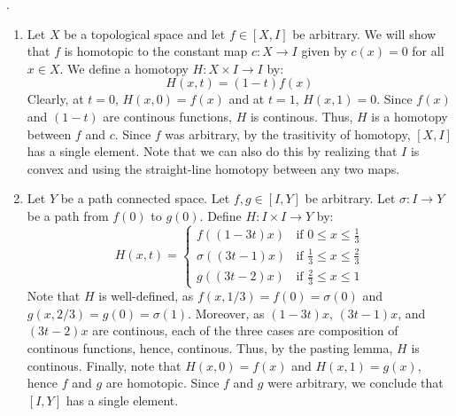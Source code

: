 \documentclass[12pt]{article}
\begin{document}
\begin{solution} .
    \begin{enumerate}
        \item Let $X$ be a topological space and let $f \in [X, I]$ be arbitrary. We will show that $f$ is homotopic to the constant map $c: X \to I$ given by $c(x) = 0$ for all $x \in X$. We define a homotopy $H: X \times I \to I$ by:
        \[ H(x, t) = (1-t)f(x) \] 
        Clearly, at $t = 0$, $H(x, 0) = f(x)$ and at $t = 1$, $H(x, 1) = 0$. Since $f(x)$ and $(1-t)$ are continous functions, $H$ is continous. Thus, $H$ is a homotopy between $f$ and $c$. Since $f$ was arbitrary, by the trasitivity of homotopy, $[X,I]$ has a single element. \bbni  
        Note that we can also do this by realizing that $I$ is convex and using the straight-line homotopy between any two maps. 
        \item Let $Y$ be a path connected space. Let $f, g \in [I, Y]$ be arbitrary. Let $\sigma: I \to Y$ be a path from $f(0)$ to $g(0)$. Define $H: I \times I \to Y$ by:
        \[ H(x, t) = \begin{cases}
            f((1-3t)x) & \text{if } 0 \leq x \leq \frac{1}{3} \\
            \sigma((3t - 1)x) & \text{if } \frac{1}{3} \leq x \leq \frac{2}{3} \\
            g((3t-2)x) & \text{if } \frac{2}{3  } \leq x \leq 1
        \end{cases} \]
        Note that $H$ is well-defined, as $f(x, 1/3) = f(0) = \sigma(0)$ and $g(x, 2/3) = g(0) = \sigma(1)$. Moreover, as $(1-3t)x$, $(3t-1)x$, and $(3t-2)x$ are continous, each of the three cases are composition of continous functions, hence, continous. Thus, by the pasting lemma, $H$ is continous. \bbni 
        Finally, note that $H(x, 0) = f(x)$ and $H(x, 1) = g(x)$, hence $f$ and $g$ are homotopic. Since $f$ and $g$ were arbitrary, we conclude that $[I,Y]$ has a single element.
    \end{enumerate}

\end{solution}
\newpage
\end{document}
